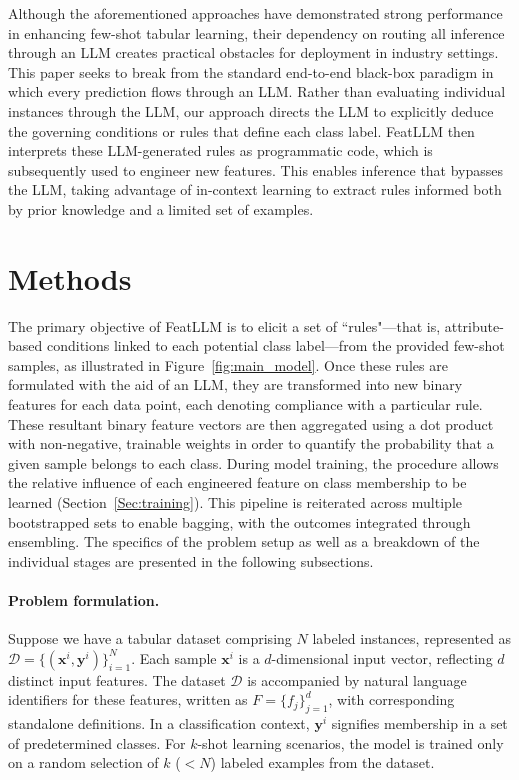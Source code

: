 Although the aforementioned approaches have demonstrated strong performance in enhancing few-shot tabular learning, their dependency on routing all inference through an LLM creates practical obstacles for deployment in industry settings. This paper seeks to break from the standard end-to-end black-box paradigm in which every prediction flows through an LLM. Rather than evaluating individual instances through the LLM, our approach directs the LLM to explicitly deduce the governing conditions or rules that define each class label. \textsf{FeatLLM} then interprets these LLM-generated rules as programmatic code, which is subsequently used to engineer new features. This enables inference that bypasses the LLM, taking advantage of in-context learning to extract rules informed both by prior knowledge and a limited set of examples.

\section{Methods}
The primary objective of \textsf{FeatLLM} is to elicit a set of ``rules"—that is, attribute-based conditions linked to each potential class label—from the provided few-shot samples, as illustrated in Figure~\ref{fig:main_model}. Once these rules are formulated with the aid of an LLM, they are transformed into new binary features for each data point, each denoting compliance with a particular rule. These resultant binary feature vectors are then aggregated using a dot product with non-negative, trainable weights in order to quantify the probability that a given sample belongs to each class. During model training, the procedure allows the relative influence of each engineered feature on class membership to be learned (Section~\ref{Sec:training}). This pipeline is reiterated across multiple bootstrapped sets to enable bagging, with the outcomes integrated through ensembling. The specifics of the problem setup as well as a breakdown of the individual stages are presented in the following subsections.

\vspace*{-0.12in}
\paragraph{Problem formulation.} Suppose we have a tabular dataset comprising $N$ labeled instances, represented as $\mathcal{D} = \{(\mathbf{x}^i, \mathbf{y}^i)\}_{i=1}^{N}$. Each sample $\mathbf{x}^i$ is a $d$-dimensional input vector, reflecting $d$ distinct input features. The dataset $\mathcal{D}$ is accompanied by natural language identifiers for these features, written as $F = \{f_j\}_{j=1}^{d}$, with corresponding standalone definitions. In a classification context, $\mathbf{y}^i$ signifies membership in a set of predetermined classes. For $k$-shot learning scenarios, the model is trained only on a random selection of $k$ ($<N$) labeled examples from the dataset.

